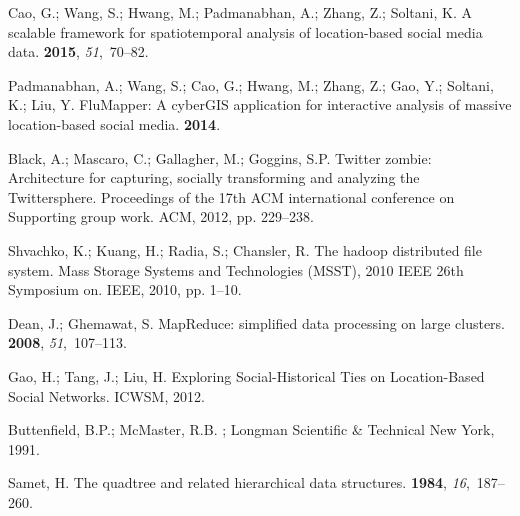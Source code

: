 \documentclass[ijgi,article,accept,moreauthors,pdftex,10pt,a4paper]{mdpi}
\theoremstyle{mdpi}
\newcounter{ex}
\newcounter{re}
\theoremstyle{mdpidefinition}
\begin{document}
\begin{thebibliography}{-------}
Cao, G.; Wang, S.; Hwang, M.; Padmanabhan, A.; Zhang, Z.; Soltani, K.
\newblock A scalable framework for spatiotemporal analysis of location-based
  social media data.
 {\bf 2015}, {\em
  51},~70--82.

Padmanabhan, A.; Wang, S.; Cao, G.; Hwang, M.; Zhang, Z.; Gao, Y.; Soltani, K.;
  Liu, Y.
\newblock FluMapper: A cyberGIS application for interactive analysis of massive
  location-based social media.
 {\bf
  2014}.

Black, A.; Mascaro, C.; Gallagher, M.; Goggins, S.P.
\newblock Twitter zombie: Architecture for capturing, socially transforming and
  analyzing the Twittersphere.
\newblock  Proceedings of the 17th ACM international conference on Supporting
  group work. ACM,  2012, pp. 229--238.

Shvachko, K.; Kuang, H.; Radia, S.; Chansler, R.
\newblock The hadoop distributed file system.
\newblock  Mass Storage Systems and Technologies (MSST), 2010 IEEE 26th
  Symposium on. IEEE,  2010, pp. 1--10.

Dean, J.; Ghemawat, S.
\newblock MapReduce: simplified data processing on large clusters.
 {\bf 2008}, {\em 51},~107--113.

Gao, H.; Tang, J.; Liu, H.
\newblock Exploring Social-Historical Ties on Location-Based Social Networks.
\newblock  ICWSM,  2012.

Buttenfield, B.P.; McMaster, R.B.
;
  Longman Scientific \& Technical New York,  1991.

Samet, H.
\newblock The quadtree and related hierarchical data structures.
 {\bf 1984}, {\em 16},~187--260.


\end{thebibliography}
\end{document}

